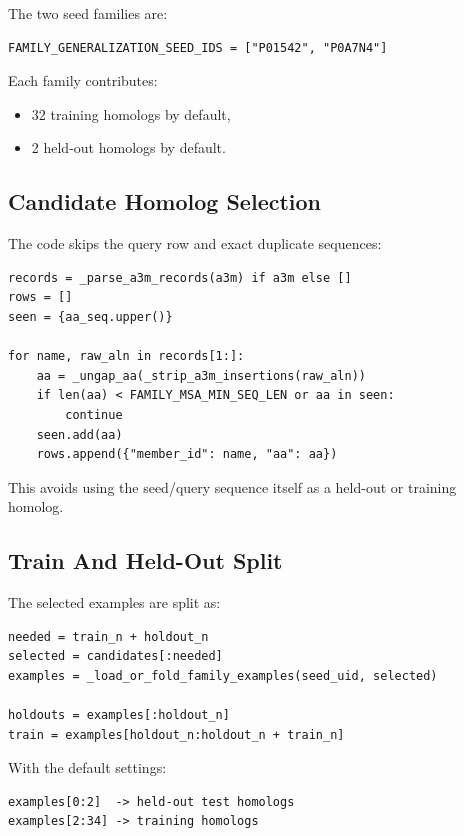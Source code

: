 \documentclass[11pt,a4paper]{article}
\begin{document}
The two seed families are:

\begin{verbatim}
FAMILY_GENERALIZATION_SEED_IDS = ["P01542", "P0A7N4"]
\end{verbatim}

Each family contributes:

\begin{itemize}
  \item 32 training homologs by default,
  \item 2 held-out homologs by default.
\end{itemize}

\subsection{Candidate Homolog Selection}

The code skips the query row and exact duplicate sequences:

\begin{verbatim}
records = _parse_a3m_records(a3m) if a3m else []
rows = []
seen = {aa_seq.upper()}

for name, raw_aln in records[1:]:
    aa = _ungap_aa(_strip_a3m_insertions(raw_aln))
    if len(aa) < FAMILY_MSA_MIN_SEQ_LEN or aa in seen:
        continue
    seen.add(aa)
    rows.append({"member_id": name, "aa": aa})
\end{verbatim}

This avoids using the seed/query sequence itself as a held-out or training homolog.

\subsection{Train And Held-Out Split}

The selected examples are split as:

\begin{verbatim}
needed = train_n + holdout_n
selected = candidates[:needed]
examples = _load_or_fold_family_examples(seed_uid, selected)

holdouts = examples[:holdout_n]
train = examples[holdout_n:holdout_n + train_n]
\end{verbatim}

With the default settings:

\begin{verbatim}
examples[0:2]  -> held-out test homologs
examples[2:34] -> training homologs
\end{verbatim}
\end{document}
